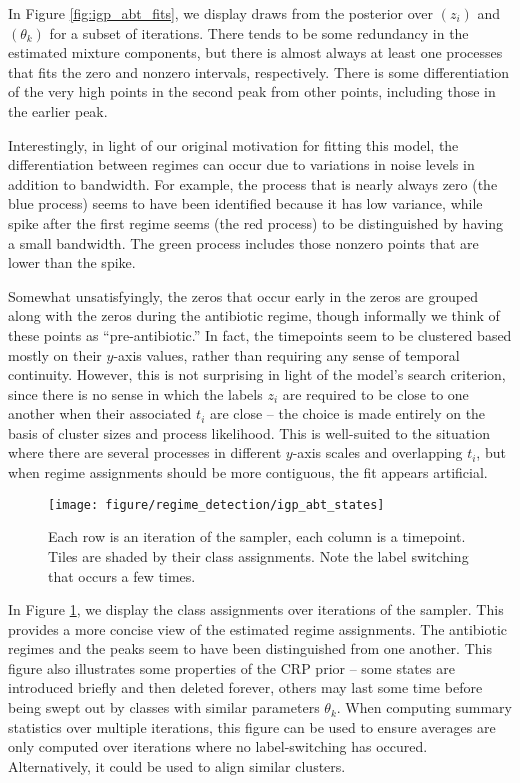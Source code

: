 In Figure \ref{fig:igp_abt_fits}, we display draws from the posterior over
$\left(z_i\right)$ and $\left(\theta_k\right)$ for a subset of iterations. There
tends to be some redundancy in the estimated mixture components, but there is
almost always at least one processes that fits the zero and nonzero intervals,
respectively. There is some differentiation of the very high points in the
second peak from other points, including those in the earlier peak.

Interestingly, in light of our original motivation for fitting this model, the
differentiation between regimes can occur due to variations in noise levels in
addition to bandwidth. For example, the process that is nearly always zero (the
blue process) seems to have been identified because it has low variance, while
spike after the first regime seems (the red process) to be distinguished by
having a small bandwidth. The green process includes those nonzero points that
are lower than the spike.

Somewhat unsatisfyingly, the zeros that occur early in the zeros are grouped
along with the zeros during the antibiotic regime, though informally we think of
these points as ``pre-antibiotic.'' In fact, the timepoints seem to be clustered
based mostly on their $y$-axis values, rather than requiring any sense of
temporal continuity. However, this is not surprising in light of the model's
search criterion, since there is no sense in which the labels $z_i$ are required
to be close to one another when their associated $t_i$ are close -- the choice
is made entirely on the basis of cluster sizes and process likelihood. This is
well-suited to the situation where there are several processes in different
$y$-axis scales and overlapping $t_i$, but when regime assignments should be
more contiguous, the fit appears artificial.

\begin{figure}
  \centering
  \texttt{[image: figure/regime\_detection/igp\_abt\_states]}
  \caption{Each row is an iteration of the sampler, each column is a timepoint.
    Tiles are shaded by their class assignments. Note the label switching that
    occurs a few times. \label{fig:igp_abt_states} }
\end{figure}

In Figure \ref{fig:igp_abt_states}, we display the class assignments over
iterations of the sampler. This provides a more concise view of the estimated
regime assignments. The antibiotic regimes and the peaks seem to have been
distinguished from one another. This figure also illustrates some properties of
the CRP prior -- some states are introduced briefly and then deleted forever,
others may last some time before being swept out by classes with similar
parameters $\theta_k$. When computing summary statistics over multiple
iterations, this figure can be used to ensure averages are only computed over
iterations where no label-switching has occured. Alternatively, it could be used
to align similar clusters.

